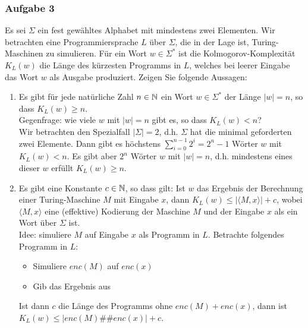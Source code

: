 \subsubsection*{Aufgabe 3}
    Es sei $\Sigma$ ein fest gewähltes Alphabet mit mindestens zwei Elementen. Wir betrachten eine Programmiersprache $L$ über $\Sigma$, die in der Lage ist, Turing-Maschinen zu simulieren. Für ein Wort $w \in \Sigma^{*}$ ist die Kolmogorov-Komplexität $K_{L}(w)$ die Länge des kürzesten Programms in $L$, welches bei leerer Eingabe das Wort $w$ als Ausgabe produziert. Zeigen Sie folgende Aussagen:
    \begin{enumerate}
        \item Es gibt für jede natürliche Zahl $n \in \mathbb{N}$ ein Wort $w \in \Sigma^{*}$ der Länge $|w| = n$, so dass $K_{L}(w) \geq n$.\\
            \LOES Gegenfrage: wie viele $w$ mit $|w| = n$ gibt es, so dass $K_{L}(w) < n$? \\
            Wir betrachten den Spezialfall $|\Sigma| = 2$, d.h. $\Sigma$ hat die minimal geforderten zwei Elemente.
            Dann gibt es höchstens $\sum\limits_{i=0}^{n-1} 2^{i} = 2^{n} - 1$ Wörter $w$ mit $K_{L}(w) < n$. Es gibt aber $2^{n}$ Wörter $w$ mit $|w| = n$, d.h. mindestens eines dieser $w$ erfüllt $K_{L}(w) \geq n$.

        \item Es gibt eine Konstante $c \in \mathbb{N}$, so dass gilt: Ist $w$ das Ergebnis der Berechnung einer Turing-Maschine $M$ mit Eingabe $x$, dann $K_{L}(w) \leq |\langle M, x \rangle| + c$, wobei $\langle M, x \rangle$ eine (effektive) Kodierung der Maschine $M$ und der Eingabe $x$ als ein Wort über $\Sigma$ ist. \\
            \LOES Idee: simuliere $M$ auf Eingabe $x$ als Programm in $L$. Betrachte folgendes Programm in $L$:
                \begin{itemize}
                    \item Simuliere $enc(M)$ auf $enc(x)$
                    \item Gib das Ergebnis aus
                \end{itemize}
            Ist dann $c$ die Länge des Programms ohne $enc(M) + enc(x)$, dann ist $K_{L}(w) \leq |enc(M)\#\#enc(x)| + c$.


\end{enumerate}
